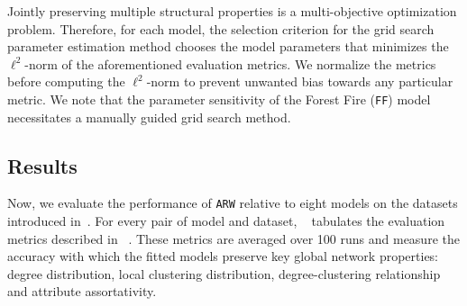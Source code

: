 Jointly preserving multiple structural properties is a multi-objective optimization
problem.
Therefore, for each model, the selection criterion for the grid search parameter estimation method
chooses the model parameters that minimizes the $\ell^2$-norm of the aforementioned evaluation metrics.
We normalize the metrics before computing the $\ell^2$-norm
to prevent unwanted bias towards any particular metric.
We note that the parameter sensitivity of the Forest Fire (\texttt{FF}) model necessitates
a manually guided grid search method.

\subsection{Results}
\label{sub:Experimental Results}

Now, we evaluate the performance of \texttt{ARW} relative to eight
models on the datasets introduced in~.
For every pair of model and dataset, ~ tabulates the evaluation metrics
described in ~.
These metrics are averaged over 100 runs and measure the accuracy with which the fitted models
preserve key global network properties: degree distribution, local clustering distribution,
degree-clustering relationship and attribute assortativity.


